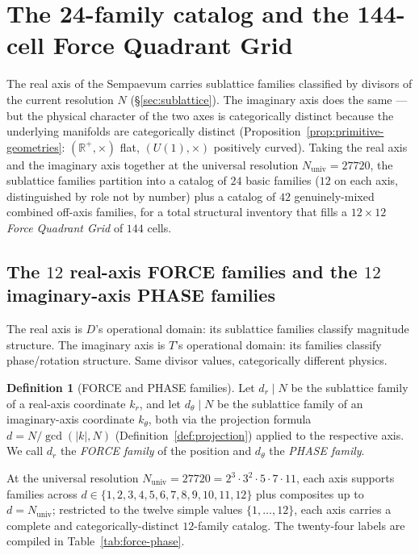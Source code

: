 \documentclass[11pt,a4paper]{article}
\theoremstyle{definition}
\newtheorem{definition}[theorem]{Definition}
\theoremstyle{remark}
\newcommand{\R}{\mathbb{R}}
\begin{document}
\section{The 24-family catalog and the 144-cell Force Quadrant Grid}\label{sec:catalog}

The real axis of the Sempaevum carries sublattice families classified by divisors of the current resolution $N$ (\S\ref{sec:sublattice}). The imaginary axis does the same --- but the physical character of the two axes is categorically distinct because the underlying manifolds are categorically distinct (Proposition~\ref{prop:primitive-geometries}: $(\R^{+},\times)$ flat, $(U(1),\times)$ positively curved). Taking the real axis and the imaginary axis together at the universal resolution $N_{\text{univ}} = 27720$, the sublattice families partition into a catalog of $24$ basic families ($12$ on each axis, distinguished by role not by number) plus a catalog of $42$ genuinely-mixed combined off-axis families, for a total structural inventory that fills a $12\times 12$ \emph{Force Quadrant Grid} of $144$ cells.

\subsection{The $12$ real-axis FORCE families and the $12$ imaginary-axis PHASE families}\label{subsec:24-families}

The real axis is $D$'s operational domain: its sublattice families classify magnitude structure. The imaginary axis is $T$'s operational domain: its families classify phase/rotation structure. Same divisor values, categorically different physics.

\begin{definition}[FORCE and PHASE families]\label{def:force-phase}
Let $d_{r} \mid N$ be the sublattice family of a real-axis coordinate $k_{r}$, and let $d_{\theta} \mid N$ be the sublattice family of an imaginary-axis coordinate $k_{\theta}$, both via the projection formula $d = N/\gcd(|k|,N)$ (Definition~\ref{def:projection}) applied to the respective axis. We call $d_{r}$ the \emph{FORCE family} of the position and $d_{\theta}$ the \emph{PHASE family}.
\end{definition}

At the universal resolution $N_{\text{univ}} = 27720 = 2^{3}\cdot 3^{2}\cdot 5\cdot 7\cdot 11$, each axis supports families across $d\in\{1,2,3,4,5,6,7,8,9,10,11,12\}$ plus composites up to $d=N_{\text{univ}}$; restricted to the twelve simple values $\{1,\ldots,12\}$, each axis carries a complete and categorically-distinct $12$-family catalog. The twenty-four labels are compiled in Table~\ref{tab:force-phase}.
\end{document}

